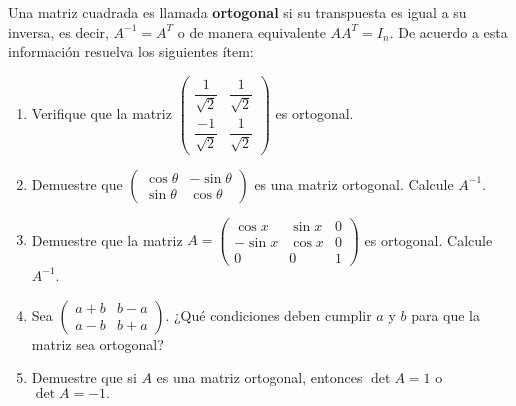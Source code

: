 \begin{prob}
Una matriz cuadrada es llamada \textbf{ortogonal} si su transpuesta es igual a su inversa, es decir, $A^{-1}=A^{T}$ o de manera equivalente $AA^{T}=I_{n}.$ De acuerdo a esta información resuelva los siguientes ítem:  

\begin{enumerate}[$(a)$]
\item Verifique que la matriz $\begin{pmatrix} \dfrac{1}{\sqrt{2}}&\dfrac{1}{\sqrt{2}}\\\dfrac{-1}{\sqrt{2}}&\dfrac{1}{\sqrt{2}}\end{pmatrix}$ es ortogonal.

\item Demuestre que $\begin{pmatrix} \cos\theta & -\sin\theta\\\sin\theta&\cos\theta \end{pmatrix}$ es una matriz ortogonal. Calcule $A^{-1}.$

\item Demuestre que la matriz $A=\left(
\begin{array}{ccc}
\cos x & \sin x & 0 \\
-\sin x & \cos x & 0 \\
0 & 0 & 1
\end{array}
\right)$ es ortogonal. Calcule $A^{-1}$.

\item Sea $\begin{pmatrix}
a+b & b-a \\
a-b & b+a
\end{pmatrix}.$ ¿Qué condiciones deben cumplir $a$ y $b$ para que la matriz sea ortogonal?

\item Demuestre que si $A$ es una matriz ortogonal, entonces $\det A=1$ o $\det A=-1.$
\end{enumerate}
\end{prob}

